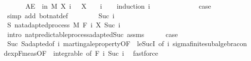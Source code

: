 \begin{isabellebody}
\ {\isacharminus}{\kern0pt}\isanewline
\ \ \isamarkupfalse%
\ {\isacharasterisk}{\kern0pt}{\isacharcolon}{\kern0pt}\ {\isachardoublequoteopen}AE\ {\isasymxi}\ in\ M{\isachardot}{\kern0pt}\ X\ i\ {\isasymxi}\ {\isacharequal}{\kern0pt}\ X\ {}\ {\isasymxi}{\isachardoublequoteclose}\ \ i\isanewline
\ \ \isamarkupfalse%
\ {\isacharparenleft}{\kern0pt}induction\ i{\isacharparenright}{\kern0pt}\isanewline
\ \ \ \ \isamarkupfalse%
\ {}\isanewline
\ \ \ \ \isamarkupfalse%
\ \isamarkupfalse%
\ {\isacharquery}{\kern0pt}case\ \isamarkupfalse%
\ {\isacharparenleft}{\kern0pt}simp\ add{\isacharcolon}{\kern0pt}\ bot{\isacharunderscore}{\kern0pt}nat{\isacharunderscore}{\kern0pt}def{\isacharparenright}{\kern0pt}\isanewline
\ \ \isamarkupfalse%
\isanewline
\ \ \ \ \isamarkupfalse%
\ {\isacharparenleft}{\kern0pt}Suc\ i{\isacharparenright}{\kern0pt}\isanewline
\ \ \ \ \isamarkupfalse%
\ S{\isacharcolon}{\kern0pt}\ nat{\isacharunderscore}{\kern0pt}adapted{\isacharunderscore}{\kern0pt}process\ M\ F\ {\isachardoublequoteopen}{\isasymlambda}i{\isachardot}{\kern0pt}\ X\ {\isacharparenleft}{\kern0pt}Suc\ i{\isacharparenright}{\kern0pt}{\isachardoublequoteclose}\ \isamarkupfalse%
\ {\isacharparenleft}{\kern0pt}intro\ nat{\isacharunderscore}{\kern0pt}predictable{\isacharunderscore}{\kern0pt}process{\isachardot}{\kern0pt}adapted{\isacharunderscore}{\kern0pt}Suc\ assms{\isacharparenright}{\kern0pt}\isanewline
\ \ \ \ \isamarkupfalse%
\ {\isacharquery}{\kern0pt}case\ \isamarkupfalse%
\ Suc\ S{\isachardot}{\kern0pt}adapted{\isacharbrackleft}{\kern0pt}of\ i{\isacharbrackright}{\kern0pt}\ martingale{\isacharunderscore}{\kern0pt}property{\isacharbrackleft}{\kern0pt}OF\ {\isacharunderscore}{\kern0pt}\ le{\isacharunderscore}{\kern0pt}SucI{\isacharcomma}{\kern0pt}\ of\ i{\isacharbrackright}{\kern0pt}\ sigma{\isacharunderscore}{\kern0pt}finite{\isacharunderscore}{\kern0pt}subalgebra{\isachardot}{\kern0pt}cond{\isacharunderscore}{\kern0pt}exp{\isacharunderscore}{\kern0pt}F{\isacharunderscore}{\kern0pt}meas{\isacharbrackleft}{\kern0pt}OF\ {\isacharunderscore}{\kern0pt}\ integrable{\isacharcomma}{\kern0pt}\ of\ {\isachardoublequoteopen}F\ i{\isachardoublequoteclose}\ {\isachardoublequoteopen}Suc\ i{\isachardoublequoteclose}{\isacharbrackright}{\kern0pt}\ \isamarkupfalse%
\ fastforce\isanewline
\ \ \isamarkupfalse%
\isanewline

\end{isabellebody}
